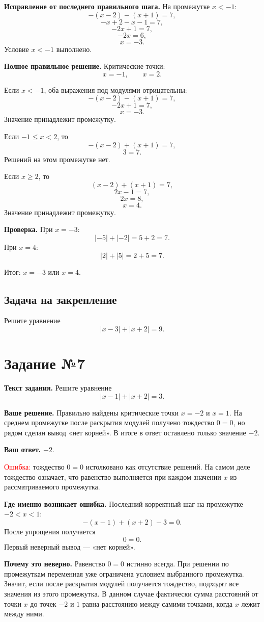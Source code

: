 \documentclass[12pt,a4paper]{article}
\newcommand{\err}{\textcolor{red}{Ошибка:}}
\newcommand{\result}{\textcolor{teal!60!black}{Итог:}}
\newcommand{\tasktitle}[1]{\phantomsection\label{task:#1}\section*{Задание №#1}}
\begin{document}
\textbf{Исправление от последнего правильного шага.} На промежутке $x<-1$:
\[
-(x-2)-(x+1)=7,
\]
\[
-x+2-x-1=7,
\]
\[
-2x+1=7,
\]
\[
-2x=6,
\]
\[
x=-3.
\]
Условие $x<-1$ выполнено.

\textbf{Полное правильное решение.} Критические точки:
\[
x=-1,\qquad x=2.
\]

Если $x<-1$, оба выражения под модулями отрицательны:
\[
-(x-2)-(x+1)=7,
\]
\[
-2x+1=7,
\]
\[
x=-3.
\]
Значение принадлежит промежутку.

Если $-1\le x<2$, то
\[
-(x-2)+(x+1)=7,
\]
\[
3=7.
\]
Решений на этом промежутке нет.

Если $x\ge2$, то
\[
(x-2)+(x+1)=7,
\]
\[
2x-1=7,
\]
\[
2x=8,
\]
\[
x=4.
\]
Значение принадлежит промежутку.

\textbf{Проверка.} При $x=-3$:
\[
|-5|+|-2|=5+2=7.
\]
При $x=4$:
\[
|2|+|5|=2+5=7.
\]

\result{} $x=-3$ или $x=4$.

\subsection*{Задача на закрепление}
Решите уравнение
\[
|x-3|+|x+2|=9.
\]

\newpage
\tasktitle{7}
\textbf{Текст задания.} Решите уравнение
\[
|x-1|+|x+2|=3.
\]

\textbf{Ваше решение.} Правильно найдены критические точки $x=-2$ и $x=1$. На среднем промежутке после раскрытия модулей получено тождество $0=0$, но рядом сделан вывод «нет корней». В итоге в ответ оставлено только значение $-2$.

\textbf{Ваш ответ.} $-2$.

\err{} тождество $0=0$ истолковано как отсутствие решений. На самом деле тождество означает, что равенство выполняется при каждом значении $x$ из рассматриваемого промежутка.

\textbf{Где именно возникает ошибка.} Последний корректный шаг на промежутке $-2<x<1$:
\[
-(x-1)+(x+2)-3=0.
\]
После упрощения получается
\[
0=0.
\]
Первый неверный вывод --- «нет корней».

\textbf{Почему это неверно.} Равенство $0=0$ истинно всегда. При решении по промежуткам переменная уже ограничена условием выбранного промежутка. Значит, если после раскрытия модулей получается тождество, подходят все значения из этого промежутка. В данном случае фактически сумма расстояний от точки $x$ до точек $-2$ и $1$ равна расстоянию между самими точками, когда $x$ лежит между ними.
\end{document}
